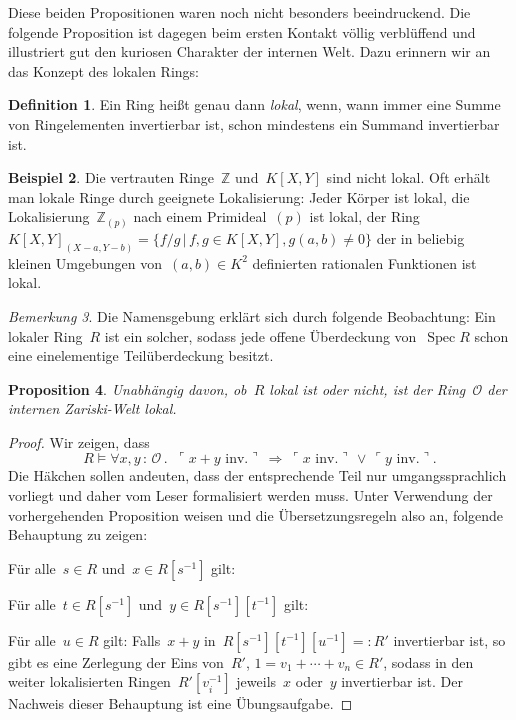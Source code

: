 \documentclass[a4paper,ngerman,12pt]{scrartcl}
\theoremstyle{definition}
\newtheorem{defn}{Definition}[section]
\newtheorem{bsp}[defn]{Beispiel}
\theoremstyle{plain}
\newtheorem{prop}[defn]{Proposition}
\theoremstyle{remark}
\newtheorem{bem}[defn]{Bemerkung}
\newcommand{\ZZ}{\mathbb{Z}}
\renewcommand{\O}{\mathcal{O}}
\DeclareMathOperator{\Spec}{Spec}
\renewcommand{\_}{\mathpunct{.}\,}
\newcommand{\?}{\,{:}\,}
\newcommand{\speak}[1]{\ulcorner\text{#1}\urcorner}
\newenvironment{indentblock}{%
  \list{}{\leftmargin\leftmargin}%
  \item\relax
}{%
  \endlist
}
\begin{document}
Diese beiden Propositionen waren noch nicht besonders beeindruckend.
Die folgende Proposition ist dagegen beim ersten Kontakt völlig verblüffend und
illustriert gut den kuriosen Charakter der internen Welt. Dazu erinnern wir an
das Konzept des lokalen Rings:
\begin{defn}Ein Ring heißt genau dann \emph{lokal}, wenn, wann immer eine Summe
von Ringelementen invertierbar ist, schon mindestens ein Summand invertierbar
ist.\end{defn}
\begin{bsp}Die vertrauten Ringe~$\ZZ$ und~$K[X,Y]$ sind nicht lokal. Oft erhält
man lokale Ringe durch geeignete Lokalisierung: Jeder Körper ist lokal,
die Lokalisierung~$\ZZ_{(p)}$ nach einem Primideal~$(p)$ ist lokal, der Ring
$K[X,Y]_{(X-a,Y-b)} = \{ f/g \,|\, f,g \in K[X,Y], g(a,b) \neq 0 \}$ der in
beliebig kleinen Umgebungen von~$(a,b) \in K^2$ definierten rationalen
Funktionen ist lokal.
\end{bsp}

\begin{bem}Die Namensgebung erklärt sich durch folgende Beobachtung: Ein
lokaler Ring~$R$ ist ein solcher, sodass jede offene Überdeckung von~$\Spec R$
schon eine einelementige Teilüberdeckung besitzt.\end{bem}

\begin{prop}\label{intern-lokal}%
Unabhängig davon, ob~$R$ lokal ist oder nicht, ist der Ring~$\O$
der internen Zariski-Welt lokal.\end{prop}
\begin{proof}
Wir zeigen, dass
\[ R \models \forall x,y\?\O\_\ \speak{$x+y$ inv.}\ \Longrightarrow\ 
  \speak{$x$ inv.} \,\vee\, \speak{$y$ inv.}. \]
Die Häkchen sollen andeuten, dass der entsprechende Teil nur umgangssprachlich
vorliegt und daher vom Leser formalisiert werden muss. Unter Verwendung der
vorhergehenden Proposition weisen und die
Übersetzungsregeln also an, folgende Behauptung zu zeigen:
\begin{indentblock}
Für alle~$s \in R$ und~$x \in R[s^{-1}]$ gilt:
\begin{indentblock}
Für alle~$t \in R[s^{-1}]$ und~$y \in R[s^{-1}][t^{-1}]$ gilt:
\begin{indentblock}
Für alle~$u \in R$ gilt: Falls~$x+y$ in~$R[s^{-1}][t^{-1}][u^{-1}] =: R'$
invertierbar ist, so gibt es eine Zerlegung der Eins von~$R'$, $1 = v_1 +
\cdots + v_n \in R'$, sodass in den
weiter lokalisierten Ringen~$R'[v_i^{-1}]$ jeweils~$x$ oder~$y$ invertierbar
ist.
\end{indentblock}
\end{indentblock}
\end{indentblock}
Der Nachweis dieser Behauptung ist eine Übungsaufgabe.
\end{proof}
\end{document}
